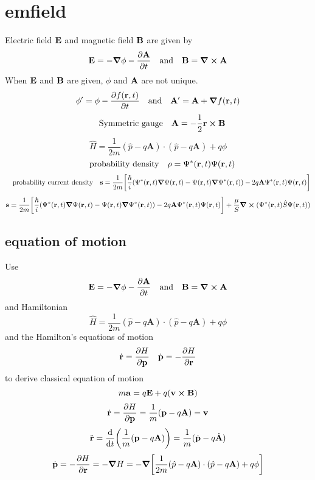 \section*{emfield}
Electric field $\vb{E}$ and magnetic field $\vb{B}$
are given by \[\vb{E}=-\grad{\phi}-\pdv{\vb{A}}{t}\qq{and}\vb{B}=\curl{\vb{A}}\]
When $\vb{E}$ and $\vb{B}$ are given, $\phi$ and $\vb{A}$ are not unique.
\[\phi'=\phi-\pdv{f(\vb{r},t)}{t}\qq{and}\vb{A'}=\vb{A}+\grad{f(\vb{r},t)}\]
\[\qq{Symmetric gauge} \vb{A}=-\frac{1}{2}\vb{r}\cp\vb{B}\]
\[\hat{H}=\frac{1}{2m}(\hat{p}-q\mathbf{A})\cdot(\hat{p}-q\mathbf{A})+ q\phi\]
\[\qq{probability density}\rho=\Psi^*(\vb{r},t)\Psi(\vb{r},t)\]
\[\qq{probability current density}\vb{s}=\frac{1}{2m}\qty[\frac{\hbar}{i}(\Psi^*(\vb{r},t)\grad{\Psi(\vb{r},t)}-\Psi(\vb{r},t)\grad{\Psi^*(\vb{r},t)})-2q\vb{A}\Psi^*(\vb{r},t)\Psi(\vb{r},t)]\]
\[\vb{s}=\frac{1}{2m}\qty[\frac{\hbar}{i}(\Psi^*(\vb{r},t)\grad{\Psi(\vb{r},t)}-\Psi(\vb{r},t)\grad{\Psi^*(\vb{r},t)})-2q\vb{A}\Psi^*(\vb{r},t)\Psi(\vb{r},t)]+\frac{\mu}{S}\curl{(\Psi^*(\vb{r},t)\hat{S}\Psi(\vb{r},t))}\]
\subsection*{equation of motion}
Use \[\vb{E}=-\grad{\phi}-\pdv{\vb{A}}{t}\qq{and}\vb{B}=\curl{\vb{A}}\]
and Hamiltonian \[\hat{H}=\frac{1}{2m}(\hat{p}-q\mathbf{A})\cdot(\hat{p}-q\mathbf{A})+ q\phi\]
and the Hamilton's equations of motion \[\dot{\vb{r}}=\pdv{H}{\vb{p}}\quad\dot{\vb{p}}=-\pdv{H}{\vb{r}}\]
to derive classical equation of motion \[m\vb{a}=q\vb{E}+q(\vb{v}\cp\vb{B})\]
\[\dot{\vb{r}}=\pdv{H}{\vb{p}}=\frac{1}{m}(\vb{p}-q\vb{A})=\vb{v}\]
\[\ddot{\vb{r}}=\dv{t}\qty(\frac{1}{m}(\vb{p}-q\vb{A}))=\frac{1}{m}(\dot{\vb{p}}-q\dot{\vb{A}})\]
\[\dot{\vb{p}}=-\pdv{H}{\vb{r}}=-\grad{H}=-\grad{\qty[\frac{1}{2m}(\hat{p}-q\mathbf{A})\cdot(\hat{p}-q\mathbf{A})+ q\phi]}\]
